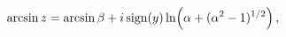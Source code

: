 \[\mathop{\mathrm{arcsin}\/}\nolimits z=\mathop{\mathrm{arcsin}\/}\nolimits\beta%
+i\mathop{\mathrm{sign}\/}\nolimits\!\left(y\right)\mathop{\ln\/}\nolimits\!%
\left(\alpha+(\alpha^{2}-1)^{1/2}\right),\]